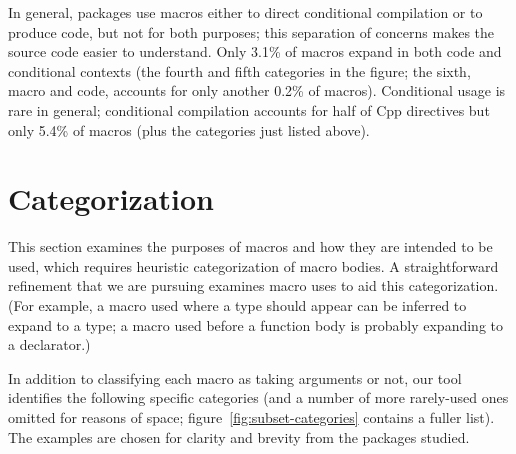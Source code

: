 \documentclass[11pt]{article}
\begin{document}
In general, packages use macros either to direct conditional compilation or
to produce code, but not for both purposes; this separation of concerns
makes the source code easier to understand.  Only 3.1\% of macros expand in
both code and conditional contexts (the fourth and fifth categories in the
figure; the sixth, macro and code, accounts for only another 0.2\% of macros).
Conditional usage is rare in general; conditional compilation accounts for
half of Cpp directives but only 5.4\% of macros (plus the categories just
listed above).



\section{Categorization}
\label{sec:categorization}

This section examines the purposes of macros and how they are intended to
be used, which requires heuristic categorization of macro bodies.  A
straightforward refinement that we are pursuing examines macro uses to aid
this categorization.  (For example, a macro used where a type should appear
can be inferred to expand to a type; a macro used before a function body is
probably expanding to a declarator.)

In addition to classifying each macro as taking arguments or not, our tool
identifies the following specific categories (and a number of more
rarely-used ones omitted for reasons of space;
figure~\ref{fig:subset-categories} contains a fuller list).  The examples
are chosen for clarity and brevity from the packages studied.
\end{document}
